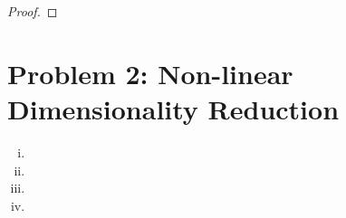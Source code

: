 \documentclass[twoside,11pt]{homework}
\DeclarePairedDelimiter{\2norm}{\lVert}{\rVert^2_2}
\newcommand{\1}[1]{\mathds{1}\left[#1\right]}
\begin{document}
\begin{proof}

\end{proof}




\section*{Problem 2: Non-linear Dimensionality Reduction}

\begin{enumerate}[(i)]

\item


\item 


\item 


\item


\end{enumerate}
\end{document}
